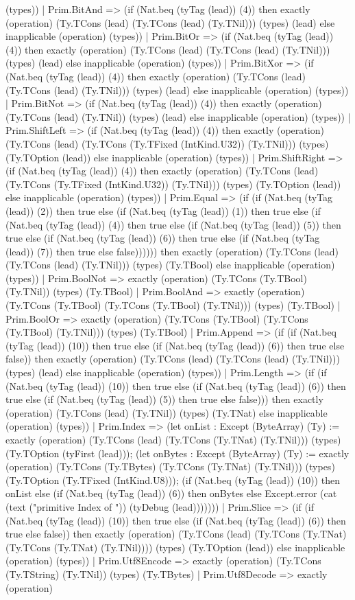 \documentclass[11pt]{article}
\begin{document}
(types)) | Prim.BitAnd => (if (Nat.beq (tyTag (lead)) (4)) then exactly (operation) (Ty.TCons (lead) (Ty.TCons (lead) (Ty.TNil))) (types) (lead) else inapplicable (operation) (types)) | Prim.BitOr => (if (Nat.beq (tyTag (lead)) (4)) then exactly (operation) (Ty.TCons (lead) (Ty.TCons (lead) (Ty.TNil))) (types) (lead) else inapplicable (operation) (types)) | Prim.BitXor => (if (Nat.beq (tyTag (lead)) (4)) then exactly (operation) (Ty.TCons (lead) (Ty.TCons (lead) (Ty.TNil))) (types) (lead) else inapplicable (operation) (types)) | Prim.BitNot => (if (Nat.beq (tyTag (lead)) (4)) then exactly (operation) (Ty.TCons (lead) (Ty.TNil)) (types) (lead) else inapplicable (operation) (types)) | Prim.ShiftLeft => (if (Nat.beq (tyTag (lead)) (4)) then exactly (operation) (Ty.TCons (lead) (Ty.TCons (Ty.TFixed (IntKind.U32)) (Ty.TNil))) (types) (Ty.TOption (lead)) else inapplicable (operation) (types)) | Prim.ShiftRight => (if (Nat.beq (tyTag (lead)) (4)) then exactly (operation) (Ty.TCons (lead) (Ty.TCons (Ty.TFixed (IntKind.U32)) (Ty.TNil))) (types) (Ty.TOption (lead)) else inapplicable (operation) (types)) | Prim.Equal => (if (if (Nat.beq (tyTag (lead)) (2)) then true else (if (Nat.beq (tyTag (lead)) (1)) then true else (if (Nat.beq (tyTag (lead)) (4)) then true else (if (Nat.beq (tyTag (lead)) (5)) then true else (if (Nat.beq (tyTag (lead)) (6)) then true else (if (Nat.beq (tyTag (lead)) (7)) then true else false)))))) then exactly (operation) (Ty.TCons (lead) (Ty.TCons (lead) (Ty.TNil))) (types) (Ty.TBool) else inapplicable (operation) (types)) | Prim.BoolNot => exactly (operation) (Ty.TCons (Ty.TBool) (Ty.TNil)) (types) (Ty.TBool) | Prim.BoolAnd => exactly (operation) (Ty.TCons (Ty.TBool) (Ty.TCons (Ty.TBool) (Ty.TNil))) (types) (Ty.TBool) | Prim.BoolOr => exactly (operation) (Ty.TCons (Ty.TBool) (Ty.TCons (Ty.TBool) (Ty.TNil))) (types) (Ty.TBool) | Prim.Append => (if (if (Nat.beq (tyTag (lead)) (10)) then true else (if (Nat.beq (tyTag (lead)) (6)) then true else false)) then exactly (operation) (Ty.TCons (lead) (Ty.TCons (lead) (Ty.TNil))) (types) (lead) else inapplicable (operation) (types)) | Prim.Length => (if (if (Nat.beq (tyTag (lead)) (10)) then true else (if (Nat.beq (tyTag (lead)) (6)) then true else (if (Nat.beq (tyTag (lead)) (5)) then true else false))) then exactly (operation) (Ty.TCons (lead) (Ty.TNil)) (types) (Ty.TNat) else inapplicable (operation) (types)) | Prim.Index => (let onList : Except (ByteArray) (Ty) := exactly (operation) (Ty.TCons (lead) (Ty.TCons (Ty.TNat) (Ty.TNil))) (types) (Ty.TOption (tyFirst (lead))); (let onBytes : Except (ByteArray) (Ty) := exactly (operation) (Ty.TCons (Ty.TBytes) (Ty.TCons (Ty.TNat) (Ty.TNil))) (types) (Ty.TOption (Ty.TFixed (IntKind.U8))); (if (Nat.beq (tyTag (lead)) (10)) then onList else (if (Nat.beq (tyTag (lead)) (6)) then onBytes else Except.error (cat (text ("primitive Index of ")) (tyDebug (lead))))))) | Prim.Slice => (if (if (Nat.beq (tyTag (lead)) (10)) then true else (if (Nat.beq (tyTag (lead)) (6)) then true else false)) then exactly (operation) (Ty.TCons (lead) (Ty.TCons (Ty.TNat) (Ty.TCons (Ty.TNat) (Ty.TNil)))) (types) (Ty.TOption (lead)) else inapplicable (operation) (types)) | Prim.Utf8Encode => exactly (operation) (Ty.TCons (Ty.TString) (Ty.TNil)) (types) (Ty.TBytes) | Prim.Utf8Decode => exactly (operation) 
\end{document}
